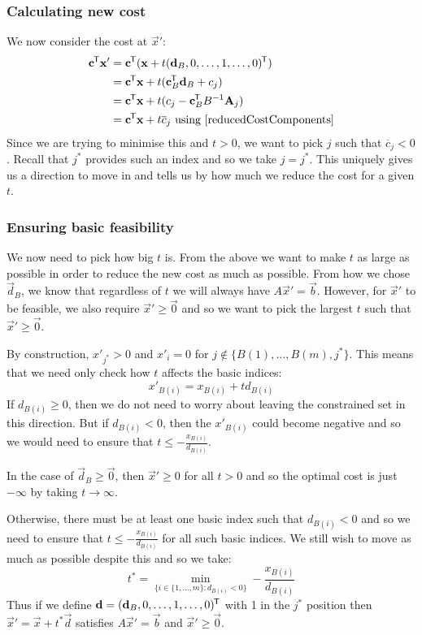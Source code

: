 \documentclass[../main.tex]{subfiles}
\begin{document}
\subsubsection{Calculating new cost}
We now consider the cost at $\vec{x}'$:
\begin{align*}
  \vec{c}^{\trans} \vec{x}' &= \vec{c}^{\trans}(\vec{x} + t(\vec{d}_B, 0, \ldots, 1, \ldots, 0)^{\trans}) \\
                            &= \vec{c}^{\trans} \vec{x} + t(\vec{c}^{\trans}_{B} \vec{d}_B + c_j) \\
                            &= \vec{c}^{\trans} \vec{x} + t(c_j - \vec{c}^{\trans}_{B} B^{-1}\vec{A}_j) \\
                            &= \vec{c}^{\trans} \vec{x} + t\overline{c}_j \text{ using \cref{reducedCostComponents}}
\end{align*}
Since we are trying to minimise this and $t > 0$, we want to pick $j$ such that $\overline{c}_j < 0$.
Recall that $j^{*}$ provides such an index and so we take $j = j^{*}$.
This uniquely gives us a direction to move in and tells us by how much we reduce the cost for a given $t$.

\subsubsection{Ensuring basic feasibility}
We now need to pick how big $t$ is.
From the above we want to make $t$ as large as possible in order to reduce the new cost as much as possible.
From how we chose $\vec{d}_B$, we know that regardless of $t$ we will always have $A\vec{x}' = \vec{b}$.
However, for $\vec{x}'$ to be feasible, we also require $\vec{x}' \geq \vec{0}$ and so we want to pick the largest $t$ such that $\vec{x}' \geq \vec{0}$.

By construction, $x'_{j^{*}} > 0$ and $x'_i = 0$ for $j \notin \{B(1), \ldots, B(m), j^{*}\}$.
This means that we need only check how $t$ affects the basic indices:
\[
  x'_{B(i)} = x_{B(i)} + t d_{B(i)}
\]
If $d_{B(i)} \geq 0$, then we do not need to worry about leaving the constrained set in this direction.
But if $d_{B(i)} < 0$, then the $x'_{B(i)}$ could become negative and so we would need to ensure that $t \leq -\frac{x_{B(i)}}{d_{B(i)}}$.

In the case of $\vec{d}_{B} \geq \vec{0}$, then $\vec{x}' \geq 0$ for all $t > 0$ and so the optimal cost is just $-\infty$ by taking $t \to \infty$.

Otherwise, there must be at least one basic index such that $d_{B(i)} < 0$ and so we need to ensure that $t \leq - \frac{x_{B(i)}}{d_{B(i)}}$ for all such basic indices.
We still wish to move as much as possible despite this and so we take:
\[
  t^{*} = \min_{\{i \in \{1, \ldots, m\}: d_{B(i)} < 0\}} -\frac{x_{B(i)}}{d_{B(i)}}
\]
Thus if we define $\mathbf{\bm{d}} = (\mathbf{\bm{d}}_B, 0, \ldots, 1, \ldots, 0)^{{\mkern-1.5mu\mathsf{T}}}$ with 1 in the  $j^{*}$ position then $\vec{x}' = \vec{x} + t^{*} \vec{d}$ satisfies $A\vec{x}' = \vec{b}$ and $\vec{x}' \geq \vec{0}$.
\end{document}
